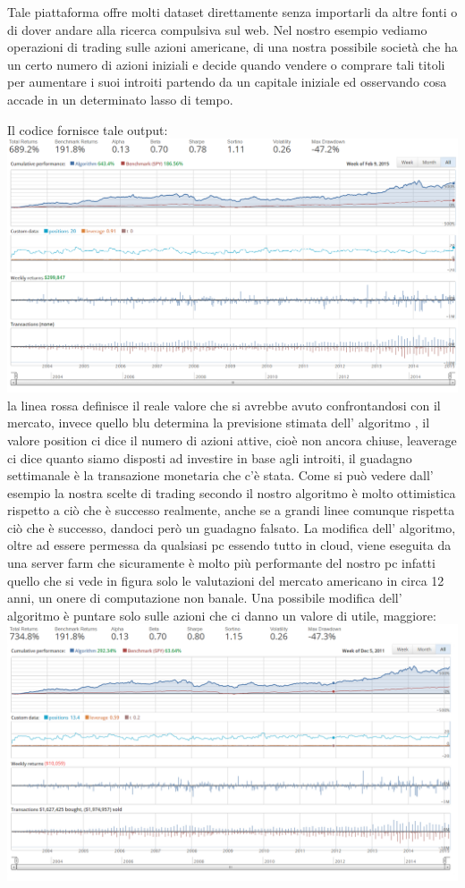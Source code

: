 {			\par 
			Tale piattaforma offre molti dataset direttamente senza importarli da altre fonti o di dover andare alla ricerca compulsiva sul web. Nel nostro esempio vediamo operazioni di trading sulle azioni americane, di una nostra possibile società che ha un certo numero di azioni iniziali e decide quando vendere o comprare tali titoli per aumentare i suoi introiti partendo da un capitale iniziale ed osservando cosa accade in un determinato lasso di tempo.
			\par 
			Il codice fornisce tale output:
			\includegraphics[width=1.0\textwidth, height=0.40\textheight]{inizio.png} 
			la linea rossa definisce il reale valore che si avrebbe avuto confrontandosi con il mercato, invece quello blu determina la previsione stimata dell' algoritmo , il valore position ci dice il numero di azioni attive, cioè non ancora chiuse, leaverage ci dice quanto siamo disposti ad investire in base agli introiti,%
			il guadagno settimanale è la transazione monetaria che c'è stata.
			Come si può vedere dall' esempio la nostra scelte di trading secondo il nostro algoritmo è molto ottimistica rispetto a ciò che è successo realmente, anche se a grandi linee comunque rispetta ciò che è successo, dandoci però un guadagno falsato.
			La modifica dell' algoritmo, oltre ad essere permessa da qualsiasi pc essendo tutto in cloud, viene eseguita da una server farm che sicuramente è molto più performante del nostro pc infatti quello che si vede in figura solo le valutazioni del mercato americano in circa 12 anni, un onere di computazione non banale.
			Una possibile modifica dell' algoritmo è  puntare solo sulle azioni che ci danno un valore di utile, maggiore:
			\includegraphics[width=1.0\textwidth, height=0.40\textheight]{factorfilter0,1.png} 
}
